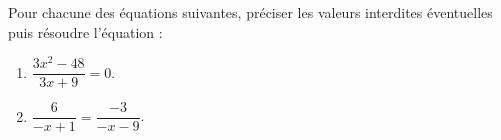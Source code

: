 \documentclass[a4paper,11pt,exos]{nsi} %
\begin{document}
\maketitle




\begin{exercice}
    Pour chacune des équations suivantes, préciser les valeurs interdites éventuelles puis résoudre l'équation :
    \begin{multicols}{2}
        \begin{enumerate}
	        \item $\dfrac{3x^2-48}{3x+9}=0$.
        
	        \item  $\dfrac{6}{-x+1}=\dfrac{-3}{-x-9}$.
        \end{enumerate}
    \end{multicols}
    
\end{exercice}
\end{document}
